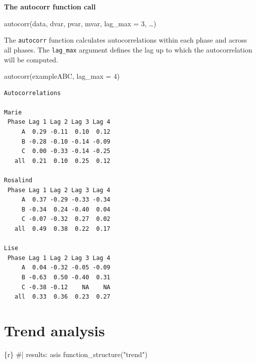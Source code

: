 \documentclass[
  letterpaper,
  DIV=11,
  numbers=noendperiod]{scrreprt}
\newenvironment{Shaded}{\begin{snugshade}}{\end{snugshade}}
\newcommand{\AttributeTok}[1]{\textcolor[rgb]{0.40,0.45,0.13}{#1}}
\newcommand{\CommentTok}[1]{\textcolor[rgb]{0.37,0.37,0.37}{#1}}
\newcommand{\DecValTok}[1]{\textcolor[rgb]{0.68,0.00,0.00}{#1}}
\newcommand{\FunctionTok}[1]{\textcolor[rgb]{0.28,0.35,0.67}{#1}}
\newcommand{\InformationTok}[1]{\textcolor[rgb]{0.37,0.37,0.37}{#1}}
\newcommand{\NormalTok}[1]{\textcolor[rgb]{0.00,0.23,0.31}{#1}}
\newcommand{\StringTok}[1]{\textcolor[rgb]{0.13,0.47,0.30}{#1}}
\begin{document}
\begin{tcolorbox}[enhanced jigsaw, breakable, rightrule=.15mm, bottomrule=.15mm, arc=.35mm, colback=white, colframe=quarto-callout-tip-color-frame, opacityback=0, leftrule=.75mm, toprule=.15mm, left=2mm]
\begin{minipage}[t]{5.5mm}
\textcolor{quarto-callout-tip-color}{\faLightbulb}
\end{minipage}%
\begin{minipage}[t]{\textwidth - 5.5mm}

\textbf{The autocorr function call}\vspace{2mm}

autocorr(data, dvar, pvar, mvar, lag\_max = 3, \ldots)

\end{minipage}%
\end{tcolorbox}

The \texttt{autocorr} function calculates autocorrelations within each
phase and across all phases. The \texttt{lag\_max} argument defines the
lag up to which the autocorrelation will be computed.

\begin{Shaded}
\begin{Highlighting}[]
\FunctionTok{autocorr}\NormalTok{(exampleABC, }\AttributeTok{lag\_max =} \DecValTok{4}\NormalTok{)}
\end{Highlighting}
\end{Shaded}

\begin{verbatim}
Autocorrelations

Marie 
 Phase Lag 1 Lag 2 Lag 3 Lag 4
     A  0.29 -0.11  0.10  0.12
     B -0.28 -0.10 -0.14 -0.09
     C  0.00 -0.33 -0.14 -0.25
   all  0.21  0.10  0.25  0.12

Rosalind 
 Phase Lag 1 Lag 2 Lag 3 Lag 4
     A  0.37 -0.29 -0.33 -0.34
     B -0.34  0.24 -0.40  0.04
     C -0.07 -0.32  0.27  0.02
   all  0.49  0.38  0.22  0.17

Lise 
 Phase Lag 1 Lag 2 Lag 3 Lag 4
     A  0.04 -0.32 -0.05 -0.09
     B -0.63  0.50 -0.40  0.31
     C -0.38 -0.12    NA    NA
   all  0.33  0.36  0.23  0.27
\end{verbatim}

\hypertarget{trend-analysis}{%
\section{Trend analysis}\label{trend-analysis}}

\begin{Shaded}
\begin{Highlighting}[]
\InformationTok{\textasciigrave{}\textasciigrave{}\textasciigrave{}\{r\}}
\CommentTok{\#| results: asis}
\FunctionTok{function\_structure}\NormalTok{(}\StringTok{"trend"}\NormalTok{)}
\InformationTok{\textasciigrave{}\textasciigrave{}\textasciigrave{}}
\end{Highlighting}
\end{Shaded}
\end{document}
